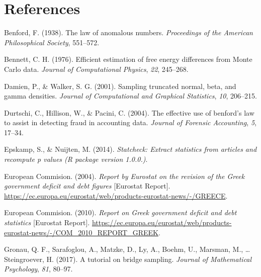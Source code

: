 \documentclass[
  english,
  man,floatsintext]{apa6}
\newlength{\cslhangindent}
\newenvironment{cslreferences}%
  {\setlength{\parindent}{0pt}%
  \everypar{\setlength{\hangindent}{\cslhangindent}}\ignorespaces}%
  {\par}
\begin{document}
\clearpage

\hypertarget{references}{%
\section{References}\label{references}}

\begingroup
\setlength{\parindent}{-0.5in}
\setlength{\leftskip}{0.5in}

\hypertarget{refs}{}
\begin{cslreferences}
\leavevmode\hypertarget{ref-benford1938law}{}%
Benford, F. (1938). The law of anomalous numbers. \emph{Proceedings of the American Philosophical Society}, 551--572.

\leavevmode\hypertarget{ref-bennett1976efficient}{}%
Bennett, C. H. (1976). Efficient estimation of free energy differences from Monte Carlo data. \emph{Journal of Computational Physics}, \emph{22}, 245--268.

\leavevmode\hypertarget{ref-damien2001sampling}{}%
Damien, P., \& Walker, S. G. (2001). Sampling truncated normal, beta, and gamma densities. \emph{Journal of Computational and Graphical Statistics}, \emph{10}, 206--215.

\leavevmode\hypertarget{ref-durtschi2004effective}{}%
Durtschi, C., Hillison, W., \& Pacini, C. (2004). The effective use of benford's law to assist in detecting fraud in accounting data. \emph{Journal of Forensic Accounting}, \emph{5}, 17--34.

\leavevmode\hypertarget{ref-epskamp2014statcheck}{}%
Epskamp, S., \& Nuijten, M. (2014). \emph{Statcheck: Extract statistics from articles and recompute p values (R package version 1.0.0.)}.

\leavevmode\hypertarget{ref-europeanCommision2004}{}%
European Commision. (2004). \emph{Report by Eurostat on the revision of the Greek government deficit and debt figures} {[}Eurostat Report{]}. \url{https://ec.europa.eu/eurostat/web/products-eurostat-news/-/GREECE}.

\leavevmode\hypertarget{ref-europeanCommision2010}{}%
European Commision. (2010). \emph{Report on Greek government deficit and debt statistics} {[}Eurostat Report{]}. \url{https://ec.europa.eu/eurostat/web/products-eurostat-news/-/COM_2010_REPORT_GREEK}.

\leavevmode\hypertarget{ref-gronau2017tutorial}{}%
Gronau, Q. F., Sarafoglou, A., Matzke, D., Ly, A., Boehm, U., Marsman, M., \ldots{} Steingroever, H. (2017). A tutorial on bridge sampling. \emph{Journal of Mathematical Psychology}, \emph{81}, 80--97.


\end{cslreferences}
\end{document}
